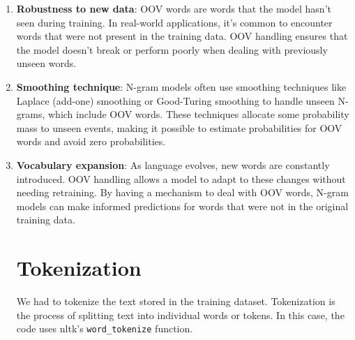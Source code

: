 \documentclass[11pt,onside]{article}
\begin{document}
\begin{enumerate}
    \item \textbf{Robustness to new data}: OOV words are words that the model hasn't seen during training. In real-world applications, it's common to encounter words that were not present in the training data. OOV handling ensures that the model doesn't break or perform poorly when dealing with previously unseen words. 
    \item \textbf{Smoothing technique}: N-gram models often use smoothing techniques like Laplace (add-one) smoothing or Good-Turing smoothing to handle unseen N-grams, which include OOV words. These techniques allocate some probability mass to unseen events, making it possible to estimate probabilities for OOV words and avoid zero probabilities. 
    \item \textbf{Vocabulary expansion}: As language evolves, new words are constantly introduced. OOV handling allows a model to adapt to these changes without needing retraining. By having a mechanism to deal with OOV words, N-gram models can make informed predictions for words that were not in the original training data. 
\section*{Tokenization}
We had to tokenize the text stored in the training dataset. Tokenization is the process of splitting text into individual words or tokens. In this case, the code uses nltk's \verb|word_tokenize| function.  



\end{enumerate}
\end{document}
